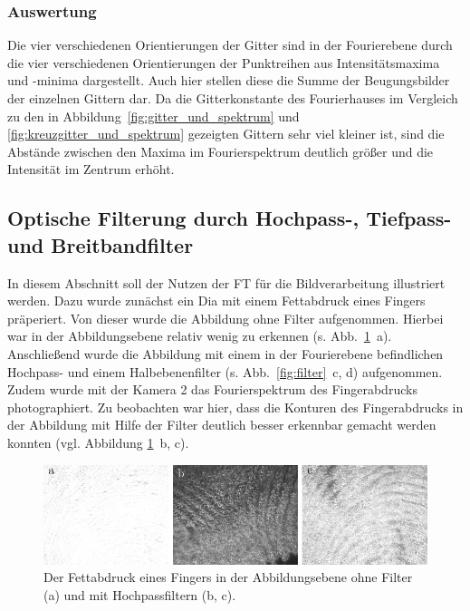 \subsubsection*{Auswertung}
Die vier verschiedenen Orientierungen der Gitter sind in der Fourierebene durch die vier verschiedenen Orientierungen der Punktreihen aus Intensitätsmaxima und -minima dargestellt. Auch hier stellen diese die Summe der Beugungsbilder der einzelnen Gittern dar. Da die Gitterkonstante des Fourierhauses im Vergleich zu den in Abbildung~\ref{fig:gitter_und_spektrum} und \ref{fig:kreuzgitter_und_spektrum} gezeigten Gittern sehr viel kleiner ist, sind die Abstände zwischen den Maxima im Fourierspektrum deutlich größer und die Intensität im Zentrum erhöht.


\subsection{Optische Filterung durch Hochpass-, Tiefpass- und Breitbandfilter}

In diesem Abschnitt soll der Nutzen der FT für die Bildverarbeitung illustriert werden. Dazu wurde zunächst ein Dia mit einem Fettabdruck eines Fingers präperiert. Von dieser wurde die Abbildung ohne Filter aufgenommen. Hierbei war in der Abbildungsebene relativ wenig zu erkennen (s. Abb.~\ref{fig:example20_Hochpass}~a). Anschließend wurde die Abbildung mit einem in der Fourierebene befindlichen Hochpass- und einem Halbebenenfilter (s. Abb.~\ref{fig:filter}~c, d) aufgenommen. Zudem wurde mit der Kamera 2 das Fourierspektrum des Fingerabdrucks photographiert. Zu beobachten war hier, dass die Konturen des Fingerabdrucks in der Abbildung mit Hilfe der Filter deutlich besser erkennbar gemacht werden konnten (vgl. Abbildung \ref{fig:example20_Hochpass}~b, c).

\begin{figure}[h]
	\centering
	\includegraphics{images/ergebniss_Fingerab/abb.pdf}
	\caption{
		Der Fettabdruck eines Fingers in der Abbildungsebene ohne Filter (a) und mit Hochpassfiltern (b, c).
	}
	\label{fig:example20_Hochpass}
\end{figure}

